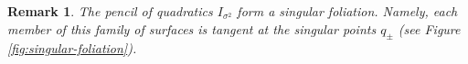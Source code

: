 \documentclass{article}
\newtheorem{rmk}{Remark}
\begin{document}
\begin{rmk}
The pencil of quadratics $I_{\sigma^2}$ form a singular foliation. Namely, each member of 
this family of surfaces is tangent at the singular points $q_\pm$ (see Figure 
\ref{fig:singular-foliation}).  
\end{rmk}





\end{document}
